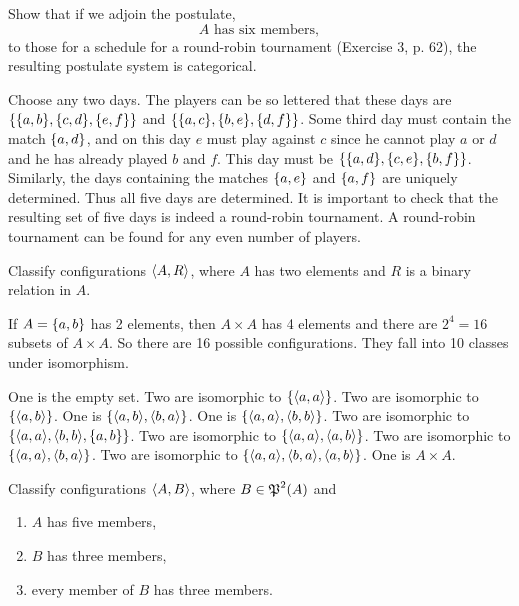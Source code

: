 \begin{exercise}
Show that if we adjoin the postulate,
\[\text{$A$ has six members},\]
to those for a schedule for a round-robin tournament (Exercise 3, p. 62), the resulting
postulate system is categorical.
\end{exercise}

\begin{solution}
Choose any two days.
The players can be so lettered that these days are $\set{\set{a, b},\set{c, d},\set{e, f}}$
and $\set{\set{a, c},\set{b, e},\set{d, f}}$.
Some third day must contain the match
$\left\{a, d\right\}$, and on this day $e$ must play against $c$ since he cannot play $a$ or $d$ and
he has already played $b$ and $f$.
This day must be $\set{\set{a,d},\set{c,e},\set{b,f}}$.
Similarly, the days containing
the matches $\left\{a, e\right\}$ and $\left\{a, f\right\}$ are uniquely determined.
Thus all five days are determined.
It is important to check that the resulting set of five days is indeed a round-robin
tournament. A round-robin tournament can be found for any even number of players.
\end{solution}

\begin{exercise}
Classify configurations $\left\langle A, R\right\rangle$, where $A$ has two elements and $R$ is a binary relation
in $A$.
\end{exercise}

\begin{solution}
If $A=\left\{a,b\right\}$ has 2 elements, then $A\times A$ has 4 elements and there are $2^4=16$ subsets
of $A\times A$. So there are 16 possible configurations. They fall into 10 classes under isomorphism.

One is the empty set.
Two are isomorphic to $\left\{\left\langle a,a\right\rangle\right\}$.
Two are isomorphic to $\left\{\left\langle a,b\right\rangle\right\}$.
One is $\set{\aprn{a,b},\aprn{b,a}}$.
One is $\set{\aprn{a,a},\aprn{b,b}}$.
Two are isomorphic to $\set{\aprn{a,a},\aprn{b,b},\set{a,b}}$.
Two are isomorphic to $\set{\aprn{a,a},\aprn{a,b}}$.
Two are isomorphic to $\set{\aprn{a,a},\aprn{b,a}}$.
Two are isomorphic to $\set{\aprn{a,a},\aprn{b,a},\aprn{a,b}}$.
One is $A\times A$.
\end{solution}

\begin{exercise}
Classify configurations $\left\langle A,B\right\rangle$, where $B \in\operatorname{\mathfrak{P}}^2(A)$ and
\begin{enumerate}[label=(\alph*)]
    \item $A$ has five members,
    \item $B$ has three members,
    \item every member of $B$ has three members.
\end{enumerate}
\end{exercise}

